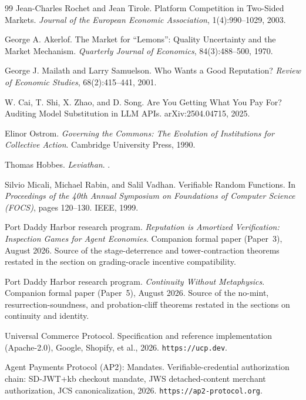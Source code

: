 \documentclass[11pt,a4paper]{article}
\theoremstyle{definition}
\newcounter{protocol}[section]
\begin{document}
\begin{thebibliography}{99}
Jean-Charles Rochet and Jean Tirole.
\newblock Platform Competition in Two-Sided Markets.
\newblock \textit{Journal of the European Economic Association}, 1(4):990--1029, 2003.

George A. Akerlof.
\newblock The Market for ``Lemons'': Quality Uncertainty and the Market Mechanism.
\newblock \textit{Quarterly Journal of Economics}, 84(3):488--500, 1970.

George J. Mailath and Larry Samuelson.
\newblock Who Wants a Good Reputation?
\newblock \textit{Review of Economic Studies}, 68(2):415--441, 2001.

W. Cai, T. Shi, X. Zhao, and D. Song.
\newblock Are You Getting What You Pay For? Auditing Model Substitution in LLM APIs.
\newblock arXiv:2504.04715, 2025.

Elinor Ostrom.
\newblock \textit{Governing the Commons: The Evolution of Institutions for Collective Action}.
\newblock Cambridge University Press, 1990.

Thomas Hobbes.
\newblock \textit{Leviathan}.
.

Silvio Micali, Michael Rabin, and Salil Vadhan.
\newblock Verifiable Random Functions.
\newblock In \textit{Proceedings of the 40th Annual Symposium on Foundations of Computer Science (FOCS)}, pages 120--130. IEEE, 1999.

Port Daddy Harbor research program.
\newblock \textit{Reputation is Amortized Verification: Inspection Games for Agent Economies}.
\newblock Companion formal paper (Paper~3), August 2026.
\newblock Source of the stage-deterrence and tower-contraction theorems restated in
the section on grading-oracle incentive compatibility.

Port Daddy Harbor research program.
\newblock \textit{Continuity Without Metaphysics}.
\newblock Companion formal paper (Paper~5), August 2026.
\newblock Source of the no-mint, resurrection-soundness, and probation-cliff
theorems restated in the sections on continuity and identity.

Universal Commerce Protocol.
\newblock Specification and reference implementation (Apache-2.0), Google, Shopify, et al., 2026.
\newblock \texttt{https://ucp.dev}.

Agent Payments Protocol (AP2): Mandates.
\newblock Verifiable-credential authorization chain: SD-JWT+kb checkout mandate, JWS detached-content merchant authorization, JCS canonicalization, 2026.
\newblock \texttt{https://ap2-protocol.org}.


\end{thebibliography}
\end{document}
